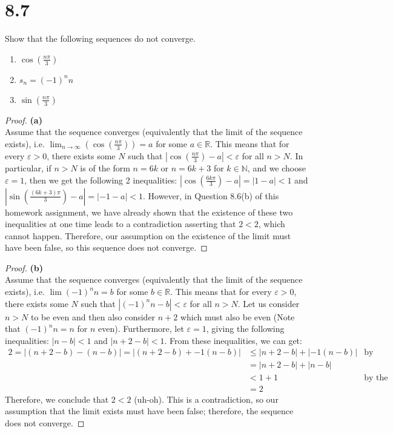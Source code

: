 \documentclass[10pt,a4paper]{article}
\theoremstyle{definition}
\begin{document}
\section*{8.7}
Show that the following sequences do not converge.
\begin{enumerate}[label = (\alph*)]
\item $\cos\left(\frac{n\pi}{3}\right)$
\item $s_n = (-1)^n n$
\item $\sin\left(\frac{n\pi}{3}\right)$
\end{enumerate}

\begin{proof}{\textbf{(a)}}
\\Assume that the sequence converges (equivalently that the limit of the sequence exists), i.e. $\displaystyle \lim_{n \to \infty} \left(\cos\left(\frac{n\pi}{3}\right)\right) = a$ for some $a \in \mathbb{R}$. This means that for every $\varepsilon > 0$, there exists some $N$ such that $\displaystyle \left|\cos\left(\frac{n\pi}{3}\right) - a\right| < \varepsilon$ for all $n > N$. In particular, if $n>N$ is of the form $n = 6k$ or $n = 6k + 3$ for $k \in \mathbb{N}$, and we choose $\varepsilon = 1$, then we get the following 2 inequalities: $|\cos(\frac{6k\pi}{3}) - a| = |1 - a| < 1$ and $|\sin(\frac{(6k + 3)\pi}{3}) - a| = |-1 - a| < 1$. However, in Question 8.6(b) of this homework assignment, we have already shown that the existence of these two inequalities at one time leads to a contradiction asserting that $2 < 2$, which cannot happen. Therefore, our assumption on the existence of the limit must have been false, so this sequence does not converge. 
\end{proof}

\begin{proof}{\textbf{(b)}}
\\Assume that the sequence converges (equivalently that the limit of the sequence exists), i.e. $\lim (-1)^n n = b$ for some $b \in \mathbb{R}$. This means that for every $\varepsilon > 0$, there exists some $N$ such that $|(-1)^n n - b| < \varepsilon$ for all $n > N$. Let us consider $n > N$ to be even and then also consider $n + 2$ which must also be even (Note that $(-1)^n n = n$ for $n $ even). Furthermore, let $\varepsilon = 1$, giving the following inequalities: $|n - b| < 1$ and $|n + 2 - b| < 1$. From these inequalities, we can get:
\begin{align*}
2 = |(n + 2 - b) - (n - b)| = |(n + 2 - b) + -1(n - b)| &\leq |n + 2 - b| + |-1(n - b)| &\text{by Triangle Inequality}\\
&= |n + 2 -b| + |n - b|\\
&< 1 + 1 &\text{by the above inequalities}\\
&= 2
\end{align*}
Therefore, we conclude that $2<2$ (uh-oh). This is a contradiction, so our assumption that the limit exists must have been false; therefore, the sequence does not converge. 
\end{proof}
\end{document}
